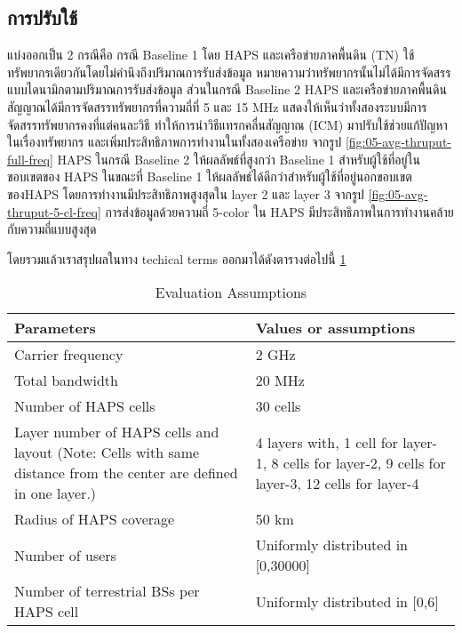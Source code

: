 \pagebreak

\subsection{การปรับใช้}

แบ่งออกเป็น 2 กรณีคือ กรณี Baseline 1 โดย HAPS และเครือข่ายภาคพื้นดิน (TN) ใช้ทรัพยากรเดียวกันโดยไม่คำนึงถึงปริมาณการรับส่งข้อมูล 
หมายความว่าทรัพยากรนั้นไม่ได้มีการจัดสรรแบบไดนามิกตามปริมาณการรับส่งข้อมูล ส่วนในกรณี Baseline 2 HAPS และเครือข่ายภาคพื้นดินสัญญาณได้มีการจัดสรรทรัพยากรที่ความถี่ที่ 5 และ 15 MHz 
แสดงให้เห็นว่าทั้งสองระบบมีการจัดสรรทรัพยากรคงที่แต่คนละวิธี ทำให้การนำวิธีแทรกคลื่นสัญญาณ (ICM) มาปรับใช้ช่วยแก้ปัญหาในเรื่องทรัพยากร
และเพิ่มประสิทธิภาพการทำงานในทั้งสองเครือข่าย จากรูป \ref{fig:05-avg-thruput-full-freq} HAPS ในกรณี Baseline 2 ให้ผลลัพธ์ที่สูงกว่า Baseline 1 
สำหรับผู้ใช้ที่อยู่ในขอบเขตของ HAPS ในขณะที่ Baseline 1 ให้ผลลัพธ์ได้ดีกว่าสำหรับผู้ใช้ที่อยู่นอกขอบเขตของHAPS โดยการทำงานมีประสิทธิภาพสูงสุดใน layer 2
และ layer 3 จากรูป \ref{fig:05-avg-thruput-5-cl-freq} การส่งข้อมูลด้วยความถี่ 5-color ใน HAPS มีประสิทธิภาพในการทำงานคล้ายกับความถี่แบบสูงสุด

โดยรวมแล้วเราสรุปผลในทาง techical terms ออกมาได้ดังตารางต่อไปนี้ \ref{table:04-haps-evaluation}

\begin{table}[h]
\centering
\begin{tabular}[h]{| l | l |}
\hline
Parameters                      & Values or assumptions \\
\hline
Carrier frequency               & 2 GHz \\
\hline
Total bandwidth                 & 20 MHz \\
\hline
Number of HAPS cells            & 30 cells \\
\hline
\parbox[t]{12em}{Layer number of HAPS cells and layout (Note: Cells with same distance from the center are defined in one layer.)}        & \parbox[t]{12em}{4 layers with, 1 cell for layer-1, 8 cells for layer-2, 9 cells for layer-3, 12 cells for layer-4} \\
\hline
Radius of HAPS coverage         & 50 km \\
\hline
Number of users                 & Uniformly distributed in [0,30000] \\
\hline
Number of terrestrial BSs per HAPS cell & Uniformly distributed in [0,6]\\
\hline
\end{tabular}
\caption{Evaluation Assumptions} \label{table:04-haps-evaluation}
\end{table}

